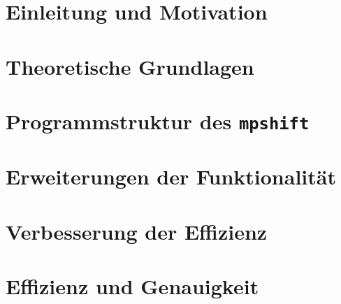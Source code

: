 \documentclass[
  paper=A4, 		%
  pagesize, 		%
  DIV=12, 		%
  ngerman,  		%
  12pt, 			%
  listof=totocnumbered, 
  bibliography=totoc, 
  index=totoc, 
  openany, 
]{scrbook}
\begin{document}
\newcommand{\iu}{\mathrm{i}\mkern1mu}
\newcommand*\diff{\mathop{}\!\mathrm{d}}
\newcommand*\Diff[1]{\mathop{}\!\mathrm{d^#1}}

\frontmatter
 
\restoregeometry
\thispagestyle{empty}
\cleardoublepage

%  



\setcounter{secnumdepth}{5}
\setcounter{tocdepth}{5}
\tableofcontents

\mainmatter %

\chapter{Einleitung und Motivation}\label{einleitung}


\chapter{Theoretische Grundlagen}\label{theorie}


\chapter{Programmstruktur des \texttt{mpshift}}\label{programmstruktur}


\chapter{Erweiterungen der Funktionalität}\label{funktionalität}



\chapter{Verbesserung der Effizienz}\label{effizienz}


\chapter{Effizienz und Genauigkeit}\label{genauigkeit}

\end{document}
